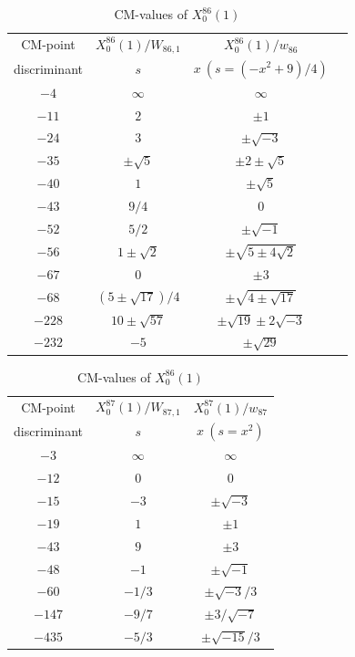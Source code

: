 \documentclass{amsart}
\theoremstyle{definition}
\begin{document}
\begin{appendices}
\renewcommand{\arraystretch}{1.5}
\tabcolsep=10pt                         
\begin{table}
\begin{tabular}{|c|c|c|c|}
\hline
CM-point& ${X_{0}^{86}(1)/W_{86,1}}$ & ${X_{0}^{86}(1)/w_{86}}$ \\ 
       discriminant   & $s$ & $x\ (s=(-x^2+9)/{4})$   \\ \hline
${-4}$ & $\infty$ & $\infty$   \\ 
${-11}$ & $2$ & $\pm 1$  \\ 
${-24}$ & $3$ & $ \pm{\sqrt{-3}}$  \\ 
${-35}$ & $\pm \sqrt{5}$ & $\pm 2\pm \sqrt{5}$ \\ 
${-40}$ & $1$ & $\pm \sqrt{5}$  \\ 
${-43}$ & ${9}/{4} $ & $0 $  \\ 
${-52}$ & ${5}/{2}$ & $\pm \sqrt{-1}$  \\ 
${-56}$ & $1\pm \sqrt{2}$ & $\pm \sqrt{5\pm 4\sqrt{2}}$ \\ 
${-67}$ & $0$ & $\pm 3$  \\ 
${-68}$ & $(5\pm\sqrt{17})/{4}$ & $\pm \sqrt{4\pm \sqrt{17}}$   \\ 
${-228}$ & $10\pm \sqrt{57}$ & $\pm\sqrt{19}\pm 2\sqrt{-3}$   \\ 
${-232}$ & $-5$ & $ \pm\sqrt{29}$  \\ \hline

\end{tabular}
\bigskip
\caption{CM-values of $X^{86}_0(1)$}

\renewcommand{\arraystretch}{1.5}
\tabcolsep=10pt                         
\begin{tabular}{|c|c|c|}
\hline
CM-point& ${X_{0}^{87}(1)/W_{87,1}}$ & ${X_{0}^{87}(1)/w_{87}}$ \\ 
        discriminant  & $s$ & $x\ (s=x^2)$  \\ \hline
${-3}$ & $\infty $ & $\infty $  \\ 
${-12}$ & $0$ & $0$  \\ 
${-15}$ & $-3$ & $\pm \sqrt{-3}$   \\ 
${-19}$ & $1$ & $ \pm1$  \\ 
${-43}$ & $9$ & $\pm 3$  \\
${-48}$ & $-1$ & $\pm \sqrt{-1}$  \\ 

${-60}$ & $-{1}/{3}$ & $\pm {\sqrt{-3}}/{3}$  \\ 
${-147}$ & $-{9}/{7}$ & $\pm{3/\sqrt{-7}}$  \\ 
${-435}$ & $-{5}/{3}$ & $\pm {\sqrt{-15}}/{3}$ \\ \hline



\end{tabular}
\end{table}
\end{appendices}
\end{document}
